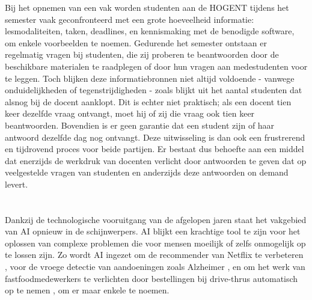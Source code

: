Bij het opnemen van een vak worden studenten aan de HOGENT tijdens het semester vaak geconfronteerd met een grote hoeveelheid informatie: lesmodaliteiten, taken, deadlines, en kennismaking met de benodigde software, om enkele voorbeelden te noemen. Gedurende het semester ontstaan er regelmatig vragen bij studenten, die zij proberen te beantwoorden door de beschikbare materialen te raadplegen of door hun vragen aan medestudenten voor te leggen. Toch blijken deze informatiebronnen niet altijd voldoende - vanwege onduidelijkheden of tegenstrijdigheden - zoals blijkt uit het aantal studenten dat alsnog bij de docent aanklopt. Dit is echter niet praktisch; als een docent tien keer dezelfde vraag ontvangt, moet hij of zij die vraag ook tien keer beantwoorden. Bovendien is er geen garantie dat een student zijn of haar antwoord dezelfde dag nog ontvangt. Deze uitwisseling is dan ook een frustrerend en tijdrovend proces voor beide partijen. Er bestaat dus behoefte aan een middel dat enerzijds de werkdruk van docenten verlicht door antwoorden te geven dat op veelgestelde vragen van studenten en anderzijds deze antwoorden on demand levert. 

\section{}%
\label{sec:onderzoeksvraag}


Dankzij de technologische vooruitgang van de afgelopen jaren staat het vakgebied van \acrfull{AI} opnieuw in de schijnwerpers. \acrlong{AI} blijkt een krachtige tool te zijn voor het oplossen van complexe problemen die voor mensen moeilijk of zelfs onmogelijk op te lossen zijn. Zo wordt \acrshort{AI} ingezet om de \gls{recommender} van Netflix te verbeteren \autocite{Steck2021}, voor de vroege detectie van aandoeningen zoals Alzheimer \autocite{Lewis2024}, en om het werk van fastfoodmedewerkers te verlichten door bestellingen bij drive-thrus automatisch op te nemen \autocite{Kinnear2024}, om er maar enkele te noemen.

